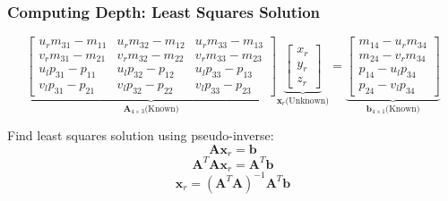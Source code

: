 \begin{frame}
    \frametitle{Computing Depth: Least Squares Solution}
    $$
    \underbrace{\begin{bmatrix}
        u_r m_{31} - m_{11} & u_r m_{32} - m_{12} & u_r m_{33} - m_{13} \\
        v_r m_{31} - m_{21} & v_r m_{32} - m_{22} & v_r m_{33} - m_{23} \\
        u_l p_{31} - p_{11} & u_l p_{32} - p_{12} & u_l p_{33} - p_{13} \\
        v_l p_{31} - p_{21} & v_l p_{32} - p_{22} & v_l p_{33} - p_{23}
    \end{bmatrix}}_{\mathbf{A}_{4\times3} \text{(Known)}}
    \underbrace{\begin{bmatrix} x_r \\ y_r \\ z_r \end{bmatrix}}_{\mathbf{x}_r \text{(Unknown)}} =
    \underbrace{\begin{bmatrix}
        m_{14} - u_r m_{34} \\
        m_{24} - v_r m_{34} \\
        p_{14} - u_l p_{34} \\
        p_{24} - v_l p_{34}
    \end{bmatrix}}_{\mathbf{b}_{4\times1} \text{(Known)}}
    $$

    Find least squares solution using pseudo-inverse:
    $$
    \mathbf{A} \mathbf{x}_r = \mathbf{b}
    $$
    $$
    \mathbf{A}^T \mathbf{A} \mathbf{x}_r = \mathbf{A}^T \mathbf{b}
    $$
    $$
    \boxed{\mathbf{x}_r = (\mathbf{A}^T \mathbf{A})^{-1} \mathbf{A}^T \mathbf{b}}
    $$
\end{frame}


